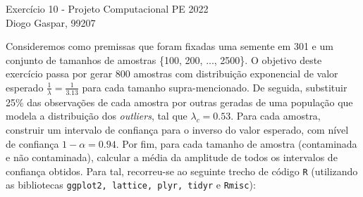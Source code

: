 \documentclass[11pt]{article}
\newcommand{\gaspar}{Diogo Gaspar, 99207}
\begin{document}
\begin{center}
{\huge{Exercício 10 - Projeto Computacional PE 2022}} \\
\vspace{1.5mm}
{\large{\gaspar}} \\
\end{center}

Consideremos como premissas que foram fixadas uma semente em 301 e um conjunto de
tamanhos de amostras \{100, 200, ..., 2500\}.
O objetivo deste exercício passa por gerar 800 amostras com distribuição exponencial
de valor esperado $\frac{1}{\lambda} = \frac{1}{3.13}$ para cada tamanho supra-mencionado.
De seguida, substituir 25\% das observações de cada amostra por outras geradas de uma
população que modela a distribuição dos \textit{outliers}, tal que $\lambda_c = 0.53$.
Para cada amostra, construir um intervalo de confiança para o inverso do valor esperado,
com nível de confiança $1 - \alpha = 0.94$. 
Por fim, para cada tamanho de amostra (contaminada e não contaminada),
calcular a média da amplitude de todos os intervalos de confiança obtidos.
Para tal, recorreu-se ao seguinte trecho de código \texttt{R} (utilizando as bibliotecas \texttt{ggplot2, lattice, plyr, tidyr} e \texttt{Rmisc}):
\end{document}
